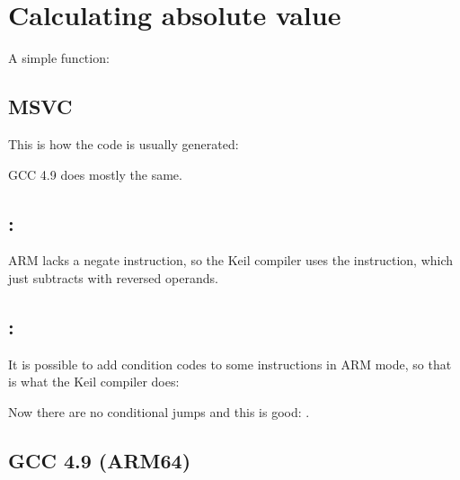 \section{Calculating absolute value}
\label{sec:abs}

A simple function:



\subsection{\Optimizing MSVC}

This is how the code is usually generated:



\ifdefined\IncludeGCC

GCC 4.9 does mostly the same.
\fi

\ifdefined\IncludeARM
\subsection{\OptimizingKeilVI: \ThumbMode}




ARM lacks a negate instruction, so the Keil compiler uses the  instruction, which just subtracts with reversed operands.

\subsection{\OptimizingKeilVI: \ARMMode}

It is possible to add condition codes to some instructions in ARM mode, so that is what the Keil compiler does:



Now there are no conditional jumps and this is good: .

\subsection{\NonOptimizing GCC 4.9 (ARM64)}


